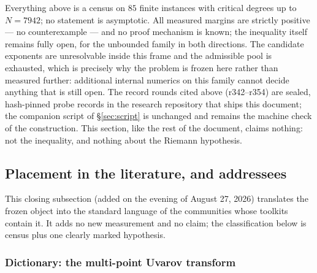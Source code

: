 \documentclass[11pt]{article}
\theoremstyle{remark}
\begin{document}
Everything above is a census on $85$ finite instances with critical
degrees up to $N=7942$; no statement is asymptotic.  All measured
margins are strictly positive --- no counterexample --- and no proof
mechanism is known; the inequality itself remains fully open, for
the unbounded family in both directions.  The candidate exponents
are unresolvable inside this frame and the admissible pool is
exhausted, which is precisely why the problem is frozen here rather
than measured further: additional internal numerics on this family
cannot decide anything that is still open.  The record rounds cited
above (r342--r354) are sealed, hash-pinned probe records in the
research repository that ships this document; the companion script
of \S\ref{sec:script} is unchanged and remains the machine check of
the construction.  This section, like the rest of the document,
claims nothing: not the inequality, and nothing about the Riemann
hypothesis.

\subsection{Placement in the literature, and addressees}
\label{sec:frozen-placement}

This closing subsection (added on the evening of August 27, 2026)
translates the frozen object into the standard language of the
communities whose toolkits contain it.  It adds no new measurement
and no claim; the classification below is census plus one clearly
marked hypothesis.

\subsubsection*{Dictionary: the multi-point Uvarov transform}
\end{document}
